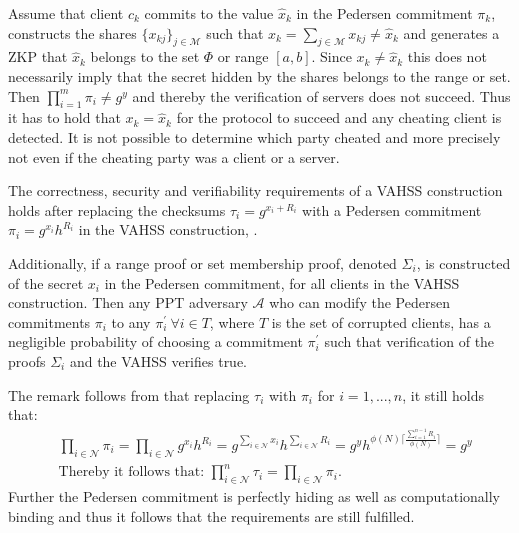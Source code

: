 Assume that client $c_k$ commits to the value $\hat{x}_k$ in the Pedersen commitment $\pi_k$, constructs the shares $\{x_{kj}\}_{j\in\mathcal{M}}$ such that $x_k = \sum_{j\in\mathcal{M}}x_{kj} \neq \hat{x}_k$ and  generates a ZKP that $\hat{x}_k$ belongs to the set $\Phi$ or range $[a,b]$. Since $x_k\neq\hat{x}_k$ this does not necessarily imply that  the secret hidden by the shares belongs to the range or set. Then  $\prod_{i=1}^m \pi_i \neq g^y$  and thereby the verification of servers does not succeed. Thus it has to hold that $x_k= \hat{x}_k$ for the protocol to succeed and any cheating client is detected. It is not possible to determine which party cheated and more precisely not even if the cheating party was a client or a server. 

\begin{Remark}
\label{thm:VAHSS_RP_CSV}
\vspace{10pt}
The correctness, security and verifiability requirements of a VAHSS construction holds after replacing the checksums $\tau_i= g^{x_i+R_i}$ with a Pedersen commitment $\pi_i= g^{x_i}h^{R_i}$ in the VAHSS construction, \cite{SumItUp}. 

Additionally, if a range proof or set membership proof, denoted $\Sigma_i$, is constructed of the secret $x_i$ in the Pedersen commitment, for all clients in the VAHSS construction.  Then any PPT adversary $\mathcal{A}$ who can modify the Pedersen commitments $\pi_i$  to any $\pi_i^{'} \:\forall  i\in T$, where $T$ is the set of corrupted clients,  has a negligible probability of choosing a commitment $\pi_i^{'}$ such that verification of the proofs $\Sigma_i$ and the VAHSS verifies true.
\end{Remark}
The remark follows from that  replacing  $\tau_i$ with $\pi_i$ for $i=1,...,n$, it still holds that:
\begin{align*}
&\prod_{i\in\mathcal{N}} \pi_i = \prod_{i\in\mathcal{N}} g^{x_i}h^{R_i} = g^{\sum_{i\in\mathcal{N}} x_i}h^{\sum_{i\in\mathcal{N}} R_i} = g^{y} h^{ \phi(N)\big\lceil \frac{\sum_{i=1}^{n-1}R_i}{\phi(N) }\big\rceil} = g^y \\
&\text{Thereby it follows that: } \prod_{i\in\mathcal{N}}^n \tau_i = \prod_{i\in\mathcal{N}} \pi_i.
\end{align*}
Further the Pedersen commitment is perfectly hiding as well as computationally binding and thus it follows that the requirements are still fulfilled. 

